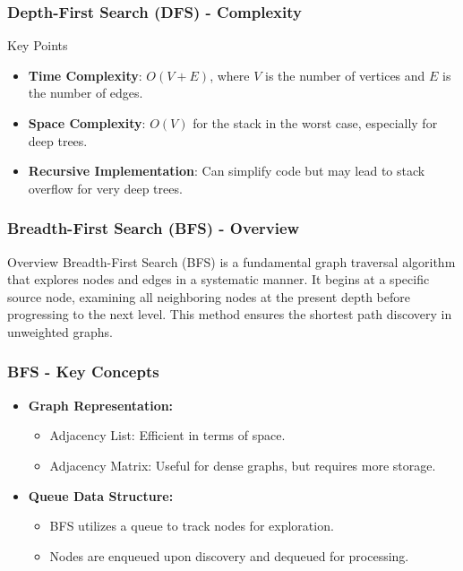 \documentclass[aspectratio=169]{beamer}
\begin{document}
\begin{frame}
    \frametitle{Depth-First Search (DFS) - Complexity}
    \begin{block}{Key Points}
        \begin{itemize}
            \item \textbf{Time Complexity}: \(O(V + E)\), where \(V\) is the number of vertices and \(E\) is the number of edges.
            \item \textbf{Space Complexity}: \(O(V)\) for the stack in the worst case, especially for deep trees.
            \item \textbf{Recursive Implementation}: Can simplify code but may lead to stack overflow for very deep trees.
        \end{itemize}
    \end{block}
\end{frame}

\begin{frame}[fragile]
    \frametitle{Breadth-First Search (BFS) - Overview}
    \begin{block}{Overview}
        Breadth-First Search (BFS) is a fundamental graph traversal algorithm that explores nodes and edges in a systematic manner. It begins at a specific source node, examining all neighboring nodes at the present depth before progressing to the next level. This method ensures the shortest path discovery in unweighted graphs.
    \end{block}
\end{frame}

\begin{frame}[fragile]
    \frametitle{BFS - Key Concepts}
    \begin{itemize}
        \item \textbf{Graph Representation:}
            \begin{itemize}
                \item Adjacency List: Efficient in terms of space.
                \item Adjacency Matrix: Useful for dense graphs, but requires more storage.
            \end{itemize}
        \item \textbf{Queue Data Structure:}
            \begin{itemize}
                \item BFS utilizes a queue to track nodes for exploration.
                \item Nodes are enqueued upon discovery and dequeued for processing.
            \end{itemize}
    \end{itemize}
\end{frame}
\end{document}
